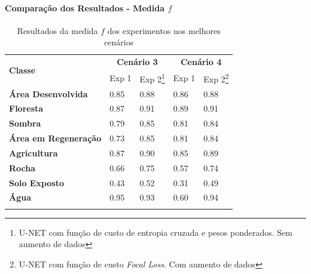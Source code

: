 \documentclass[%
  10pt,%
  aspectratio = 169,%
  compress,%
  t,%
  english,%
  brazilian,%
  tikz,
]{beamer}
\begin{document}
\begin{frame}
\setcounter{footnote}{0}
\framesubtitle{Comparação dos Resultados - Medida $f$}

\begin{table}[!ht]
    \caption{Resultados da medida $f$ dos experimentos nos melhores cenários}%
    \centering
    \begin{tabular}{lllll}
    \toprule
        \multirow{2}{*}{\textbf{Classe}} & \multicolumn{2}{c}{\textbf{Cenário 3}} & \multicolumn{2}{c}{\textbf{Cenário 4}} \\ 
        \cline{2-5} & Exp 1 & Exp 2\footnote{U-NET com função de custo de entropia cruzada e pesos ponderados. Sem aumento de dados} & Exp 1 & Exp 2\footnote{U-NET com função de custo \textit{Focal Loss}. Com aumento de dados} \\
        \midrule
        \textbf{Área Desenvolvida}          & 0.85 & \colorbox{green!25}{0.88} & 0.86 & \colorbox{green!25}{0.88} \\
        \textbf{Floresta}                   & 0.87 & \colorbox{green!25}{0.91} & 0.89 & \colorbox{green!25}{0.91} \\
        \textbf{Sombra}                     & 0.79 & \colorbox{green!25}{0.85} & 0.81 & \colorbox{green!25}{0.84} \\
        \textbf{Área em Regeneração}        & 0.73 & \colorbox{green!25}{0.85} & 0.81 & \colorbox{green!25}{0.84} \\
        \textbf{Agricultura}                & 0.87 & \colorbox{green!25}{0.90} & 0.85 & \colorbox{green!25}{0.89} \\
        \textbf{Rocha}                      & 0.66 & \colorbox{green!25}{0.75} & 0.57 & \colorbox{green!25}{0.74} \\
        \textbf{Solo Exposto}               & 0.43 & \colorbox{green!25}{0.52} & 0.31 & \colorbox{green!25}{0.49} \\
        \textbf{Água}                       & \colorbox{green!25}{0.95} & 0.93 & 0.60 & \colorbox{green!25}{0.94} \\ 
        \bottomrule
        \addlinespace
    \end{tabular}
    \label{tab:res:fscore:classe}%
\end{table}

\end{frame}
\end{document}
